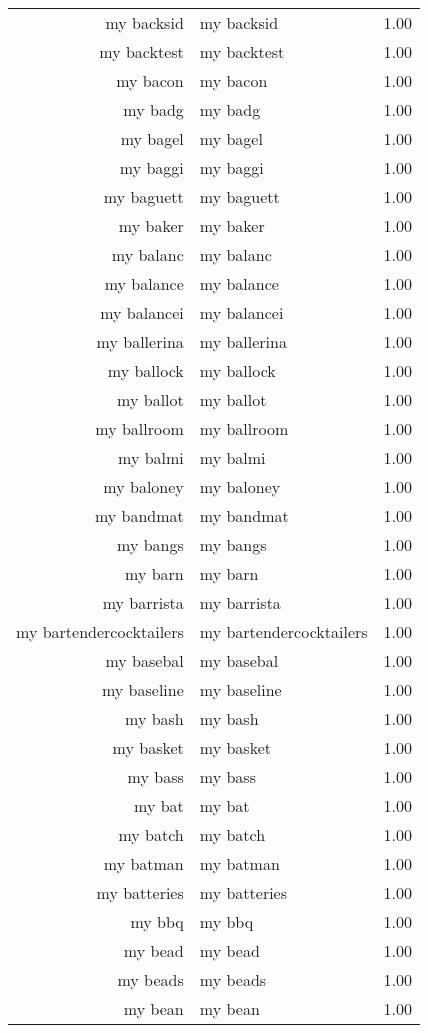 \begin{table}[ht]
\begin{tabular}{rlr}
  my backsid & my backsid & 1.00 \\ 
  my backtest & my backtest & 1.00 \\ 
  my bacon & my bacon & 1.00 \\ 
  my badg & my badg & 1.00 \\ 
  my bagel & my bagel & 1.00 \\ 
  my baggi & my baggi & 1.00 \\ 
  my baguett & my baguett & 1.00 \\ 
  my baker & my baker & 1.00 \\ 
  my balanc & my balanc & 1.00 \\ 
  my balance & my balance & 1.00 \\ 
  my balancei & my balancei & 1.00 \\ 
  my ballerina & my ballerina & 1.00 \\ 
  my ballock & my ballock & 1.00 \\ 
  my ballot & my ballot & 1.00 \\ 
  my ballroom & my ballroom & 1.00 \\ 
  my balmi & my balmi & 1.00 \\ 
  my baloney & my baloney & 1.00 \\ 
  my bandmat & my bandmat & 1.00 \\ 
  my bangs & my bangs & 1.00 \\ 
  my barn & my barn & 1.00 \\ 
  my barrista & my barrista & 1.00 \\ 
  my bartendercocktailers & my bartendercocktailers & 1.00 \\ 
  my basebal & my basebal & 1.00 \\ 
  my baseline & my baseline & 1.00 \\ 
  my bash & my bash & 1.00 \\ 
  my basket & my basket & 1.00 \\ 
  my bass & my bass & 1.00 \\ 
  my bat & my bat & 1.00 \\ 
  my batch & my batch & 1.00 \\ 
  my batman & my batman & 1.00 \\ 
  my batteries & my batteries & 1.00 \\ 
  my bbq & my bbq & 1.00 \\ 
  my bead & my bead & 1.00 \\ 
  my beads & my beads & 1.00 \\ 
  my bean & my bean & 1.00 \\ 

\end{tabular}
\end{table}
